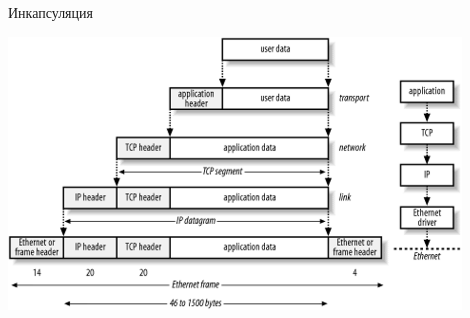 \begin{frame}{Инкапсуляция}

	\center\includegraphics[width=0.9\textwidth]{../../slides/networking/net_encapsulation.png}

\end{frame}


